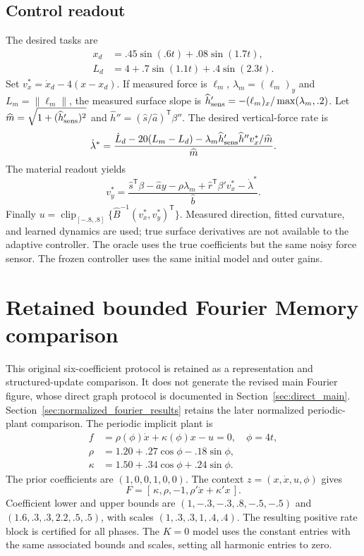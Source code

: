 \documentclass[journal]{IEEEtran}
\begin{document}
\subsection{Control readout}
The desired tasks are
\begin{align*}
 x_d&=.45\sin(.6t)+.08\sin(1.7t),\\
 L_d&=4+.7\sin(1.1t)+.4\sin(2.3t).
\end{align*}
Set $v_x^*=\dot x_d-4(x-x_d)$. If measured force is $\ell_m$,
$\lambda_m=(\ell_m)_y$ and $L_m=\|\ell_m\|$, the measured surface slope is
$\widehat h'_{\rm sens}=-(\ell_m)_x/\max(\lambda_m,.2)$.
Let $\widehat m=\sqrt{1+(\widehat h'_{\rm sens})^2}$ and
$\widehat h''=(\widehat s/\widehat a)^{\mathsf T}\beta''$.
The desired vertical-force rate is
\begin{equation}
 \dot\lambda^*=\frac{\dot L_d-20(L_m-L_d)
 -\lambda_m\widehat h'_{\rm sens}\widehat h''v_x^*/\widehat m}{\widehat m}.
\end{equation}
The material readout yields
\begin{equation}
 v_y^*=\frac{\widehat s^{\mathsf T}\beta-\widehat a y-\rho\lambda_m
 +\widehat r^{\mathsf T}\beta'v_x^*-\dot\lambda^*}{\widehat b}.
\end{equation}
Finally $u=\operatorname{clip}_{[-.8,.8]}\{\widehat B^{-1}(v_x^*,v_y^*)^{\mathsf T}\}$.
Measured direction, fitted curvature, and learned dynamics are used; true
surface derivatives are not available to the adaptive controller.
The oracle uses the true coefficients but the same noisy force sensor.
The frozen controller uses the same initial model and outer gains.

\section{Retained bounded Fourier Memory comparison}
\label{sec:fourier_protocol}
This original six-coefficient protocol is retained as a representation and
structured-update comparison. It does not generate the revised main Fourier
figure, whose direct graph protocol is documented in
Section~\ref{sec:direct_main}. Section~\ref{sec:normalized_fourier_results}
retains the later normalized periodic-plant comparison.
The periodic implicit plant is
\begin{align}
 f&=\rho(\phi)\dot x+\kappa(\phi)x-u=0,\quad \phi=4t,\\
 \rho&=1.20+.27\cos\phi-.18\sin\phi,\\
 \kappa&=1.50+.34\cos\phi+.24\sin\phi.
\end{align}
The prior coefficients are $(1,0,0,1,0,0)$. The context
$z=(x,\dot x,u,\phi)$ gives
\begin{equation}
 F=[\,\kappa,\rho,-1,\rho'\dot x+\kappa'x\,].
\end{equation}
Coefficient lower and upper bounds are
$(1,-.3,-.3,.8,-.5,-.5)$ and $(1.6,.3,.3,2.2,.5,.5)$, with scales
$(1,.3,.3,1,.4,.4)$. The resulting positive rate block is certified for all
phases. The $K=0$ model uses the constant entries with the same associated
bounds and scales, setting all harmonic entries to zero.
\end{document}
